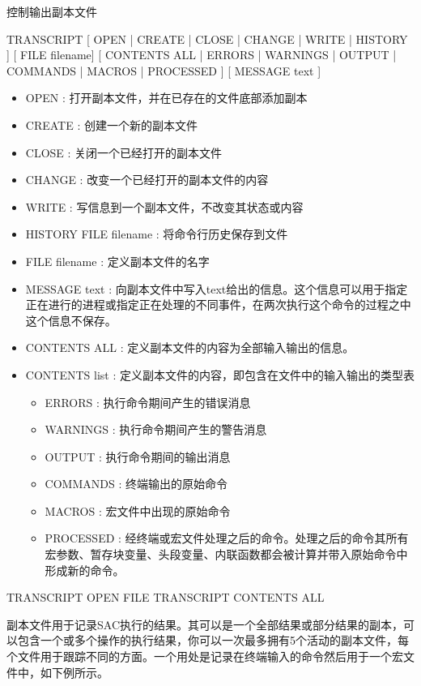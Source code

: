 \label{cmd:transcript}

控制输出副本文件

TRANSCRIPT [ OPEN | CREATE | CLOSE | CHANGE | WRITE | HISTORY ] [ FILE filename]  [ CONTENTS ALL | ERRORS | WARNINGS | OUTPUT | COMMANDS | MACROS | PROCESSED ] [ MESSAGE text ]

\begin{itemize}
\item OPEN : 打开副本文件，并在已存在的文件底部添加副本 
\item CREATE : 创建一个新的副本文件 
\item CLOSE : 关闭一个已经打开的副本文件 
\item CHANGE : 改变一个已经打开的副本文件的内容 
\item WRITE : 写信息到一个副本文件，不改变其状态或内容 
\item HISTORY FILE filename : 将命令行历史保存到文件 
\item FILE filename : 定义副本文件的名字 
\item MESSAGE text : 向副本文件中写入text给出的信息。这个信息可以用于指定正在进行的进程或指定正在处理的不同事件，在两次执行这个命令的过程之中这个信息不保存。 
\item CONTENTS ALL : 定义副本文件的内容为全部输入输出的信息。 
\item CONTENTS list : 定义副本文件的内容，即包含在文件中的输入输出的类型表
	\begin{itemize}
	\item ERRORS : 执行命令期间产生的错误消息
	\item WARNINGS : 执行命令期间产生的警告消息
	\item OUTPUT : 执行命令期间的输出消息 
	\item COMMANDS : 终端输出的原始命令 
	\item MACROS : 宏文件中出现的原始命令 
	\item PROCESSED : 经终端或宏文件处理之后的命令。处理之后的命令其所有宏参数、暂存块变量、头段变量、内联函数都会被计算并带入原始命令中形成新的命令。\\
	\end{itemize}
\end{itemize}

TRANSCRIPT OPEN FILE TRANSCRIPT CONTENTS ALL

副本文件用于记录SAC执行的结果。其可以是一个全部结果或部分结果的副本，可以包含一个或多个操作的执行结果，你可以一次最多拥有5个活动的副本文件，每个文件用于跟踪不同的方面。一个用处是记录在终端输入的命令然后用于一个宏文件中，如下例所示。

